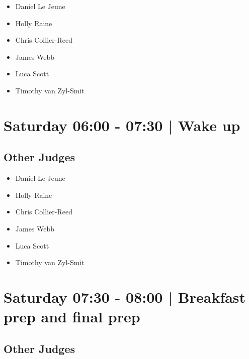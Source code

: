 \documentclass[10pt]{article}
\begin{document}
            \begin{itemize}
                            \item Daniel Le Jeune
                            \item Holly Raine
                            \item Chris Collier-Reed
                            \item James Webb
                            \item Luca Scott
                            \item Timothy van Zyl-Smit
                        \end{itemize}
        

            \section*{Saturday 06:00
        -
        07:30
        |
         Wake up}
        
                
        \subsection*{Other Judges}
        
            \begin{itemize}
                            \item Daniel Le Jeune
                            \item Holly Raine
                            \item Chris Collier-Reed
                            \item James Webb
                            \item Luca Scott
                            \item Timothy van Zyl-Smit
                        \end{itemize}
        

            \section*{Saturday 07:30
        -
        08:00
        |
         Breakfast prep and final prep}
        
                
        \subsection*{Other Judges}
        
\end{document}
